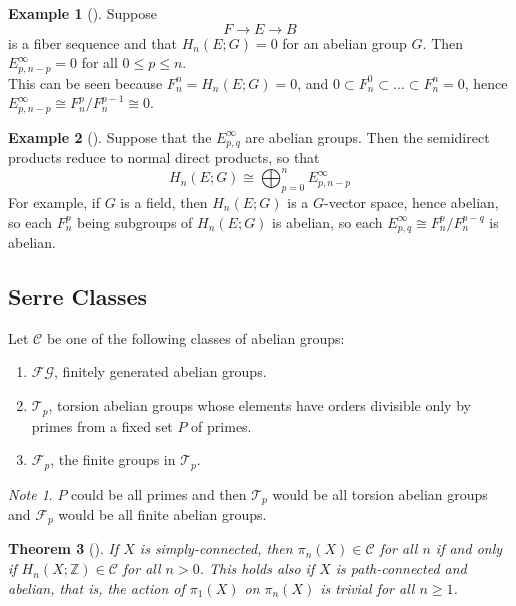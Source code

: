 \documentclass[reqno]{amsart}
\newtheorem{theorem}{Theorem}[section]
\theoremstyle{definition}
\newtheorem{example}[theorem]{Example}
\theoremstyle{remark}
\newtheorem*{note}{Note}
\begin{document}
\begin{example}[]
    Suppose
    \[
    F \to E \to B
    \] 
    is a fiber sequence and that
    $H_n(E;G) = 0$ for an abelian group $G$.
    Then $E_{p, n -p}^{\infty} = 0$ for all
    $0 \le p \le n$.\\
    This can be seen because
    $F_{n}^{n} = H_n(E;G) = 0$, and
    $0 \subset F_n^{0} \subset \ldots \subset 
    F_n^{n} = 0$, hence
    $E_{p, n-p}^{\infty} \cong
    F_n^{p} / F_n^{p-1} \cong 0$.
\end{example}
    

\begin{example}[]
    Suppose that the $E_{p,q}^{\infty}$ are abelian groups.
    Then the semidirect products reduce to normal direct
    products, so that
    \[
    H_n(E;G) \cong
    \bigoplus_{p=0}^{n} E_{p,n-p}^{\infty}
    \] 
    For example, if $G$ is a field, then 
    $H_n(E;G)$ is a $G$-vector space, hence abelian, so
    each $F_n^{p}$ being subgroups of $H_n(E;G)$ is abelian,
    so each $E_{p,q}^{\infty} \cong
    F_{n}^{p} / F_{n}^{p-q}$ is abelian.
\end{example}


\subsection{Serre Classes}

Let
$\mathcal{C}$ be one of the following classes of abelian groups:
\begin{enumerate}
    \item $\mathcal{F} \mathcal{G}$, finitely generated
        abelian groups.
    \item $\mathcal{T}_p$, torsion abelian groups whose
        elements have orders divisible only by
        primes from a fixed set $P$ of primes.
    \item $\mathcal{F}_p$, the finite groups
        in $\mathcal{T}_p$.
\end{enumerate}


\begin{note}
    $P$ could be all primes and then $\mathcal{T}_p$ would
    be all torsion abelian groups and
    $\mathcal{F}_p$ would be all finite abelian groups.
\end{note}

\begin{theorem}[]\label{Thm:SIAO9}
    If $X$ is simply-connected, then $\pi_n (X) \in 
    \mathcal{C}$ for all $n$ if and only if
    $H_n(X;\mathbb{Z}) \in \mathcal{C}$ for all
    $n > 0$. This holds also if
    $X$ is path-connected and abelian, that is, the
    action of $\pi_1 (X)$ on $\pi_n(X)$ is trivial
    for all $n\ge 1$.
\end{theorem}
\end{document}
